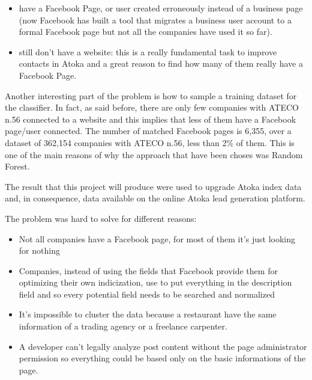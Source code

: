 \begin{itemize}
\item have a Facebook Page, or user created erroneously instead of a business page (now Facebook has built a tool that migrates a business user account to a formal Facebook page but not all the companies have used it so far).
\item still don't have a website: this is a really fundamental task to improve contacts in Atoka and a great reason to find how many of them really have a Facebook Page.
\end{itemize}

Another interesting part of the problem is how to sample a training dataset for the classifier. In fact, as said before, there are only few companies with ATECO n.56 connected to a website and this implies that less of them have a Facebook page/user connected. The number of matched Facebook pages is 6,355, over a dataset of 362,154 companies with ATECO n.56, less than 2\% of them. This is one of the main reasons of why the approach that have been choses was Random Forest.

The result that this project will produce were used to upgrade Atoka index data and, in consequence, data available on the online Atoka lead generation platform.

The problem was hard to solve for different reasons:
\begin{itemize}
\item Not all companies have a Facebook page, for most of them it's just looking for nothing
\item Companies, instead of using the fields that Facebook provide them for optimizing their own indicization, use to put everything in the description field and so every potential field needs to be searched and normalized
\item It's impossible to cluster the data because a restaurant have the same information of a trading agency or a freelance carpenter.
\item A developer can't legally analyze post content without the page administrator permission so everything could be based only on the basic informations of the page.
\end{itemize}


